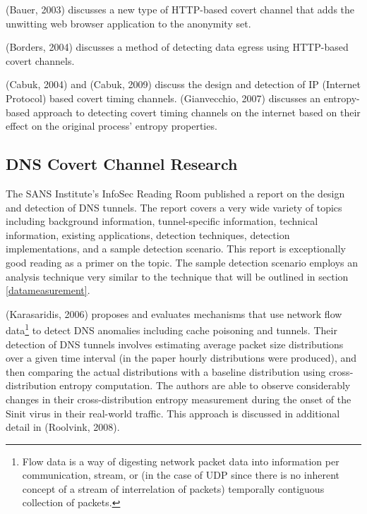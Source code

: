 \documentclass[12pt]{article}
\theoremstyle{remark}
\theoremstyle{definition}
\theoremstyle{definition}
\theoremstyle{definition}
\begin{document}
(Bauer, 2003)\cite{Bauer2003} discusses a new type of HTTP-based covert channel that adds the unwitting web browser application to the anonymity set.

(Borders, 2004)\cite{Borders2004} discusses a method of detecting data egress using HTTP-based covert channels.

(Cabuk, 2004)\cite{Cabuk2004} and (Cabuk, 2009)\cite{Cabuk2009} discuss the design and detection of IP (Internet Protocol) based covert timing channels. (Gianvecchio, 2007)\cite{Gianvecchio2007} discusses an entropy-based approach to detecting covert timing channels on the internet based on their effect on the original process' entropy properties.

\subsection{DNS Covert Channel Research}
The SANS Institute's InfoSec Reading Room published a report on the design and detection of DNS tunnels\cite{SANS2013}. The report covers a very wide variety of topics including background information, tunnel-specific information, technical information, existing applications, detection techniques, detection implementations, and a sample detection scenario. This report is exceptionally good reading as a primer on the topic. The sample detection scenario employs an analysis technique very similar to the technique that will be outlined in section \ref{datameasurement}.

(Karasaridis, 2006)\cite{Karasaridis2006} proposes and evaluates mechanisms that use network flow data\footnote{Flow data is a way of digesting network packet data into information per communication, stream, or (in the case of UDP since there is no inherent concept of a stream of interrelation of packets) temporally contiguous collection of packets.} to detect DNS anomalies including cache poisoning and tunnels. Their detection of DNS tunnels involves estimating average packet size distributions over a given time interval (in the paper hourly distributions were produced), and then comparing the actual distributions with a baseline distribution using cross-distribution entropy computation. The authors are able to observe considerably changes in their cross-distribution entropy measurement during the onset of the Sinit virus in their real-world traffic. This approach is discussed in additional detail in (Roolvink, 2008)\cite{Roolvink2008}.
\end{document}
